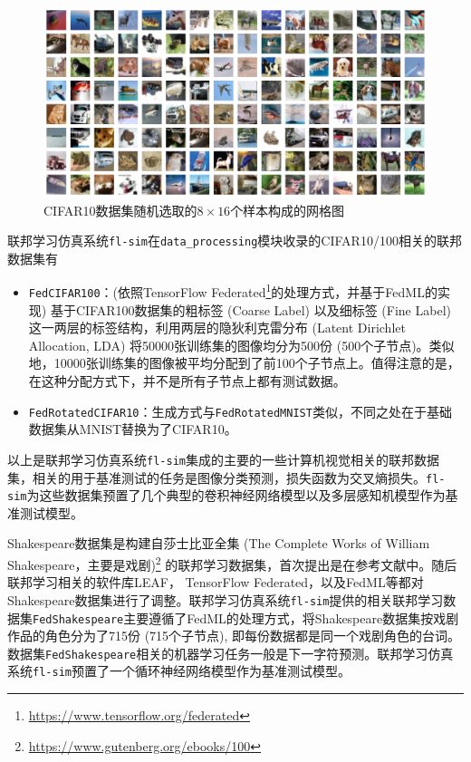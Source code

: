 \begin{figure}[ht]
\centering
\includegraphics[width=\textwidth]{figures/cifar10_random_grid_view.pdf}
\caption{CIFAR10数据集随机选取的$8\times 16$个样本构成的网格图}
\label{fig:cifar10_random_grid_view}
\end{figure}

联邦学习仿真系统\texttt{fl-sim}在\texttt{data\_processing}模块收录的CIFAR10/100相关的联邦数据集有
\begin{itemize}
    \item \texttt{FedCIFAR100}：(依照TensorFlow Federated\footnote{\url{https://www.tensorflow.org/federated}}的处理方式，并基于FedML\cite{he_2020_fedml}的实现) 基于CIFAR100数据集的粗标签 (Coarse Label) 以及细标签 (Fine Label) 这一两层的标签结构，利用两层的隐狄利克雷分布 (Latent Dirichlet Allocation, LDA) \cite{Li_2006_LDA}将50000张训练集的图像均分为500份 (500个子节点)。类似地，10000张训练集的图像被平均分配到了前100个子节点上。值得注意的是，在这种分配方式下，并不是所有子节点上都有测试数据。
    \item \texttt{FedRotatedCIFAR10}：生成方式与\texttt{FedRotatedMNIST}\cite{Ghosh_2022_cfl}类似，不同之处在于基础数据集从MNIST替换为了CIFAR10。
\end{itemize}

以上是联邦学习仿真系统\texttt{fl-sim}集成的主要的一些计算机视觉相关的联邦数据集，相关的用于基准测试的任务是图像分类预测，损失函数为交叉熵损失。\texttt{fl-sim}为这些数据集预置了几个典型\cite{mcmahan2017fed_avg, zhang2020fedpd, sahu2018fedprox}的卷积神经网络模型以及多层感知机模型作为基准测试模型。

Shakespeare数据集是构建自莎士比亚全集 (The Complete Works of William Shakespeare，主要是戏剧)\footnote{\url{https://www.gutenberg.org/ebooks/100}} 的联邦学习数据集，首次提出是在参考文献\parencite{mcmahan2017fed_avg}中。随后联邦学习相关的软件库LEAF\cite{caldas2018_leaf}， TensorFlow Federated，以及FedML\cite{he_2020_fedml}等都对Shakespeare数据集进行了调整。联邦学习仿真系统\texttt{fl-sim}提供的相关联邦学习数据集\texttt{FedShakespeare}主要遵循了FedML\cite{he_2020_fedml}的处理方式，将Shakespeare数据集按戏剧作品的角色分为了715份 (715个子节点), 即每份数据都是同一个戏剧角色的台词。数据集\texttt{FedShakespeare}相关的机器学习任务一般是下一字符预测。联邦学习仿真系统\texttt{fl-sim}预置了一个循环神经网络模型\cite{mcmahan2017fed_avg}作为基准测试模型。

